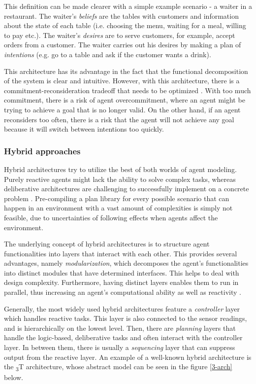 \documentclass[0main.tex]{subfiles}
\begin{document}
This definition can be made clearer with a simple example scenario - a waiter in a restaurant.
The waiter's \emph{beliefs} are the tables with customers and information about the state of each
table (i.e. choosing the menu, waiting for a meal, willing to pay etc.). The waiter's \emph{desires}
are to serve customers, for example, accept orders from a customer. The waiter carries out his
desires by making a plan of \emph{intentions} (e.g. go to a table and ask if the customer wants a
drink).

This architecture has its advantage in the fact that the functional decomposition of the system
is clear and intuitive. However, with this architecture, there is a commitment-reconsideration
tradeoff that needs to be optimized \cite{Wooldridge1999}. With too much commitment, there is a
risk of agent overcommitment, where an agent might be trying to achieve a goal that is no
longer valid. On the other hand, if an agent reconsiders too often, there is a risk that the
agent will not achieve any goal because it will switch between intentions too quickly.

\subsubsection{Hybrid approaches}\label{hybrid-arch}

Hybrid architectures try to utilize the best of both worlds of agent modeling. Purely reactive 
agents might lack the ability to solve complex tasks, whereas deliberative architectures are 
challenging to successfully implement on a concrete problem \cite{Anthony2014}. Pre-compiling a plan
library for every possible scenario that can happen in an environment with a vast amount of complexities
is simply not feasible, due to uncertainties of following effects when agents 
affect the environment. 

The underlying concept of hybrid architectures is to structure agent functionalities into layers 
that interact with each other. This provides several advantages, namely \emph{modularization},
which decomposes the agent's functionalities into distinct modules that have determined 
interfaces. This helps to deal with design complexity. Furthermore, having distinct layers enables 
them to run in parallel, thus increasing an agent's computational ability as well as reactivity
\cite{Mueller1999}.

Generally, the most widely used hybrid architectures feature a \emph{controller} layer which
handles reactive tasks. This layer is also connected to the sensor readings, and is
hierarchically on the lowest level. Then, there are \emph{planning} layers that handle the
logic-based, deliberative tasks and often interact with the controller layer. In between them,
there is usually a \emph{sequencing} layer that can suppress output from the reactive layer.
An example of a well-known hybrid architecture is the \textsubscript{3}T architecture, whose
abstract model can be seen in the figure \ref{3-arch} below.
\end{document}

